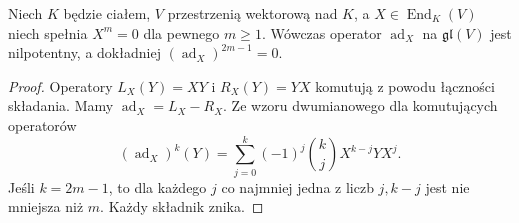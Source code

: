 \begin{lemat}
\label{aa:lem:engel-ad}
Niech $K$ będzie ciałem, $V$ przestrzenią wektorową
nad $K$, a $X\in\operatorname{End}_K(V)$ niech spełnia $X^m=0$
dla pewnego $m\ge1$. Wówczas operator
$\operatorname{ad}_X$ na $\mathfrak{gl}(V)$ jest
nilpotentny, a dokładniej $(\operatorname{ad}_X)^{2m-1}=0$.
\end{lemat}
\begin{proof}
Operatory $L_X(Y)=XY$ i $R_X(Y)=YX$ komutują
z powodu łączności składania. Mamy
$\operatorname{ad}_X=L_X-R_X$.
Ze wzoru dwumianowego dla komutujących operatorów
\[
 (\operatorname{ad}_X)^k(Y)
 =\sum_{j=0}^k(-1)^j\binom{k}{j}X^{k-j}YX^j.
\]
Jeśli $k=2m-1$, to dla każdego $j$ co najmniej
jedna z liczb $j,k-j$ jest nie mniejsza niż $m$.
Każdy składnik znika.
\end{proof}


